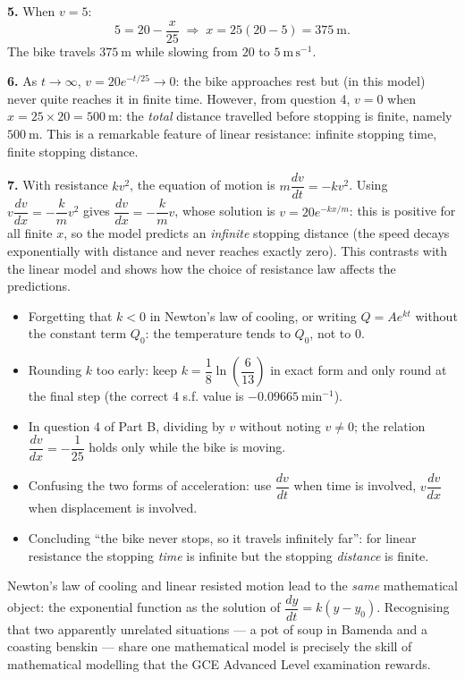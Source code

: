\documentclass[11pt]{article}
\newcommand{\cle}[1]{{\popxbold\color{popdark}#1}}
\begin{document}
\textbf{5.} When $v=5$:
\[
5=20-\frac{x}{25}
\;\Longrightarrow\;
x=25(20-5)=375\ \text{m}.
\]
The bike travels $375\ \mathrm{m}$ while slowing from $20$ to $5\ \mathrm{m\,s^{-1}}$.

\textbf{6.} As $t\to\infty$, $v=20e^{-t/25}\to 0$: the bike approaches rest but (in this model) never quite reaches it in finite time. However, from question 4, $v=0$ when $x=25\times 20=500\ \mathrm{m}$: the \emph{total} distance travelled before stopping is finite, namely $500\ \mathrm{m}$. This is a remarkable feature of linear resistance: infinite stopping time, finite stopping distance.

\textbf{7.} With resistance $kv^2$, the equation of motion is $m\dfrac{dv}{dt}=-kv^2$. Using $v\dfrac{dv}{dx}=-\dfrac{k}{m}v^2$ gives $\dfrac{dv}{dx}=-\dfrac{k}{m}v$, whose solution is $v=20e^{-kx/m}$: this is positive for all finite $x$, so the model predicts an \emph{infinite} stopping distance (the speed decays exponentially with distance and never reaches exactly zero). This contrasts with the linear model and shows how the choice of resistance law affects the predictions.

\begin{attention}
\begin{itemize}
\item Forgetting that $k<0$ in Newton's law of cooling, or writing $Q=Ae^{kt}$ without the constant term $Q_0$: the temperature tends to $Q_0$, not to $0$.
\item Rounding $k$ too early: keep $k=\dfrac{1}{8}\ln\!\left(\dfrac{6}{13}\right)$ in exact form and only round at the final step (the correct 4 s.f. value is $-0.09665\ \mathrm{min^{-1}}$).
\item In question 4 of Part B, dividing by $v$ without noting $v\neq 0$; the relation $\dfrac{dv}{dx}=-\dfrac{1}{25}$ holds only while the bike is moving.
\item Confusing the two forms of acceleration: use $\dfrac{dv}{dt}$ when time is involved, $v\dfrac{dv}{dx}$ when displacement is involved.
\item Concluding ``the bike never stops, so it travels infinitely far'': for linear resistance the stopping \emph{time} is infinite but the stopping \emph{distance} is finite.
\end{itemize}
\end{attention}

\begin{savaistu}
Newton's law of cooling and linear resisted motion lead to the \emph{same} mathematical object: the exponential function as the solution of $\dfrac{dy}{dt}=k(y-y_0)$. Recognising that two apparently unrelated situations — a pot of soup in Bamenda and a coasting benskin — share one mathematical model is precisely the skill of \cle{mathematical modelling} that the GCE Advanced Level examination rewards.
\end{savaistu}
\end{document}
